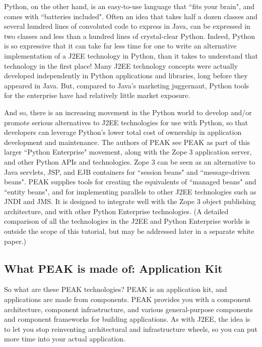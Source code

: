 Python, on the other hand, is an easy-to-use language that ``fits your
brain", and comes with ``batteries included".  Often an idea that takes
half a dozen classes and several hundred lines of convoluted code to
express in Java, can be expressed in two classes and less than a hundred
lines of crystal-clear Python.  Indeed, Python is so expressive that it
can take far less time for one to write an alternative implementation of
a J2EE technology in Python, than it takes to understand that technology
in the first place!  Many J2EE technology concepts were actually
developed independently in Python applications and libraries, long
before they appeared in Java.  But, compared to Java's marketing
juggernaut, Python tools for the enterprise have had relatively little
market exposure.

And so, there is an increasing movement in the Python world to develop
and/or promote serious alternatives to J2EE technologies for use with
Python, so that developers can leverage Python's lower total cost of
ownership in application development and maintenance. The authors of
PEAK see PEAK as part of this larger ``Python Enterprise" movement, along
with the Zope 3 application server, and other Python APIs and
technologies. Zope 3 can be seen as an alternative to Java servlets,
JSP, and EJB containers for ``session beans" and ``message-driven beans".
PEAK supplies tools for creating the equivalents of ``managed beans" and
``entity beans", and for implementing parallels to other J2EE technologies
such as JNDI and JMS.  It is designed to integrate well with the Zope 3
object publishing architecture, and with other Python Enterprise
technologies. (A detailed comparison of all the technologies in the J2EE
and Python Enterprise worlds is outside the scope of this tutorial, but
may be addressed later in a separate white paper.)


\subsection{What PEAK is made of: Application Kit}

So what are these PEAK technologies? PEAK is an application kit, and
applications are made from components.  PEAK provides you with a
component architecture, component infrastructure, and various
general-purpose components and component frameworks for building
applications. As with J2EE, the idea is to let you stop reinventing
architectural and infrastructure wheels, so you can put more time into
your actual application.

